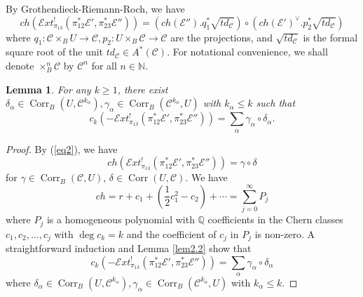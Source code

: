\documentclass[11pt]{amsart}
\newtheorem{lemma}[theorem]{Lemma}
\theoremstyle{definition}
\newcommand{\mC}{\mathcal{C}}
\begin{document}
 By Grothendieck-Riemann-Roch, we have \begin{equation}\label{eq2}
    ch \left ( \mathscr Ext^!_{\pi_{13}} \left (\pi_{12}^* \mathcal E', \pi_{23}^* \mathcal E'' \right ) \right ) = \left ( ch (\mathcal E''). q_1^* \sqrt{td_\mC}\right )\circ \left ( ch (\mathcal E')^\vee. p_2^* \sqrt{td_\mC}\right )
\end{equation} 
where $q_1: \mC\times_B  U\rightarrow \mC, p_2:  U\times_B \mC \rightarrow  \mC$ are the projections, and $\sqrt{td_\mC}$ is the formal square root of the unit $td_\mC\in A^*(\mC)$. 
For notational convenience, we shall denote $\times_B^n\mC$ by $\mC^n$ for all $n\in\mathbb{N}$.

\begin{lemma}\label{lem:ck-gamma-delta}
 For any $k\geq 1$, there exist $\delta_{\alpha}\in \operatorname{Corr}_B( U, \mC^{k_\alpha}), \gamma_{\alpha }\in \operatorname{Corr}_B(\mC^{k_\alpha},  U)$ with $k_\alpha \leq k$ such that
   \begin{equation*}
        c_k \left (-\mathscr Ext^!_{\pi_{13}} \left (\pi_{12}^* \mathcal E', \pi_{23}^*\mathcal E''  \right ) \right ) =\sum_{\alpha }\gamma_\alpha \circ \delta_\alpha.
    \end{equation*} 
\end{lemma}
\begin{proof}
    By (\ref{eq2}), we have 
	$$ ch \left ( \mathscr Ext^!_{\pi_{13}} \left (\pi_{12}^* \mathcal E', \pi_{23}^* \mathcal E'' \right ) \right ) = \gamma \circ \delta $$ 
	for $\gamma \in \operatorname{Corr}_B(\mC,  U)$, $\delta\in \operatorname{Corr}( U, \mC)$. 
	We have
	\begin{equation*}
        ch = r+ c_1 + \left(\frac{1}{2}c_1^2 -c_2\right)+\cdots = \sum_{j=0}^\infty P_j 
    \end{equation*} 
	where $P_j$ is a homogeneous polynomial with $\mathbb Q$ coefficients in the Chern classes $c_1, c_2, \dots , c_j$ with $\deg c_k=k$ and the coefficient of $c_j$ in $P_j$ is non-zero.  
	A straightforward induction and Lemma \ref{lem2.2} show that  \begin{equation*}
        c_k \left ( -\mathscr Ext^!_{\pi_{13}} \left (\pi_{12}^* \mathcal E', \pi_{23}^*\mathcal E''  \right )\right ) =\sum_{\alpha }\gamma_\alpha \circ \delta_\alpha 
    \end{equation*} 
	where $\delta_{\alpha}\in \operatorname{Corr}_B( U, \mC^{k_\alpha}), \gamma_{\alpha }\in \operatorname{Corr}_B(\mC^{k_\alpha},  U)$ with $k_\alpha \leq k$. 
  
\end{proof} 
\end{document}
